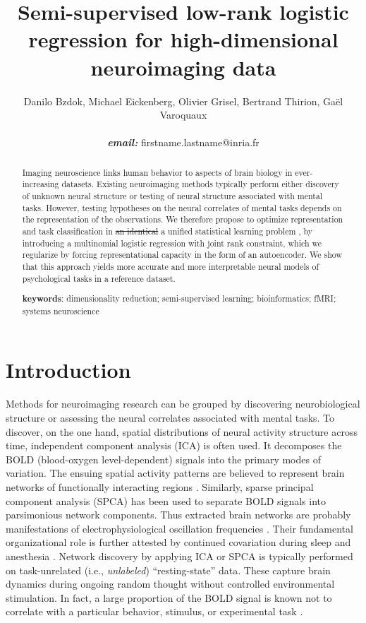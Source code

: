 \documentclass{article} %
\title{Semi-supervised low-rank logistic regression for
high-dimensional neuroimaging data}
\newcommand{\suggestadd}[1]{{\color{blue} #1}}
\newcommand{\suggestremove}[1]{{\color{red} \sout{#1}}}
\begin{document}
\author{Danilo Bzdok, Michael Eickenberg, Olivier Grisel,
  Bertrand Thirion,
  Ga\"el Varoquaux \\\\\textbf{\textit{email:} }firstname.lastname@inria.fr}

\maketitle

\begin{abstract}
Imaging neuroscience links human behavior to aspects of brain
biology in ever-increasing datasets.
%
Existing neuroimaging methods typically perform either discovery of unknown
neural structure or testing of neural structure associated with mental tasks.
%
However, testing hypotheses on the neural correlates of mental tasks
depends on the representation of the observations.
%
We therefore propose to optimize
representation and task classification in
\suggestremove{an identical} \suggestadd{a unified} statistical learning 
problem\suggestadd{, by introducing a multinomial logistic regression with
joint rank constraint, which we regularize by forcing representational
capacity in the form of an autoencoder}.
%
We show that this approach yields more accurate and more interpretable
neural models of psychological tasks in a reference dataset.
%

\textbf{keywords}: dimensionality reduction; semi-supervised learning;
bioinformatics; fMRI; systems neuroscience

\end{abstract}

\section{Introduction}
%
Methods for neuroimaging research can be grouped by discovering
neurobiological structure or assessing the neural correlates associated
with mental tasks.
To discover, on the one hand, spatial distributions of neural activity
structure across time,
independent component analysis (ICA) \cite{beckmann2005} is often used.
It decomposes the BOLD (blood-oxygen level-dependent) signals into the
primary modes of variation.
The ensuing spatial activity patterns are believed to represent
brain networks of
functionally interacting regions \cite{smith2009}.
Similarly, sparse principal component analysis (SPCA) \cite{varoqu2011}
has been used to
separate BOLD signals into parsimonious network components.
Thus extracted brain networks are probably
manifestations of electrophysiological oscillation frequencies \cite{hipp15}.
Their fundamental organizational role is further
attested by continued covariation during sleep and anesthesia \cite{fox07}.
%
Network discovery by applying ICA or SPCA is typically performed on
task-unrelated (i.e., \textit{unlabeled}) ``resting-state'' data.
These capture brain dynamics
during ongoing random thought without controlled environmental stimulation.
In fact, a large proportion of the BOLD signal is known
not to correlate with a particular behavior, stimulus, or experimental task
\cite{fox07}. 
\end{document}

